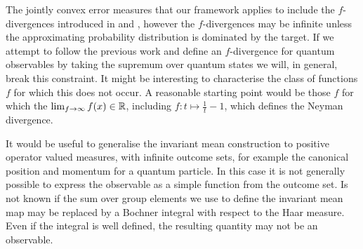 The jointly convex error measures that our framework applies to include the $f$-divergences introduced in \cite{10.2307/2984279} and \cite{der1964informationstheoretische}, however the $f$-divergences may be infinite unless the approximating probability distribution is dominated by the target. If we attempt to follow the previous work and define an $f$-divergence for quantum observables by taking the supremum over quantum states we will, in general, break this constraint. It might be interesting to characterise the class of functions $f$ for which this does not occur. A reasonable starting point would be those $f$ for which the $\lim_{f\to\infty}f(x) \in \mathbb{R}$, including $f:t\mapsto \frac{1}{t}-1$, which defines the Neyman divergence.

It would be useful to generalise the invariant mean construction to positive operator valued measures, with infinite outcome sets, for example the canonical position and momentum for a quantum particle. In this case it is not generally possible to express the observable as a simple function from the outcome set. Is not known if the sum over group elements we use to define the invariant mean map may be replaced by a Bochner integral with respect to the Haar measure. Even if the integral is well defined, the resulting quantity may not be an observable.